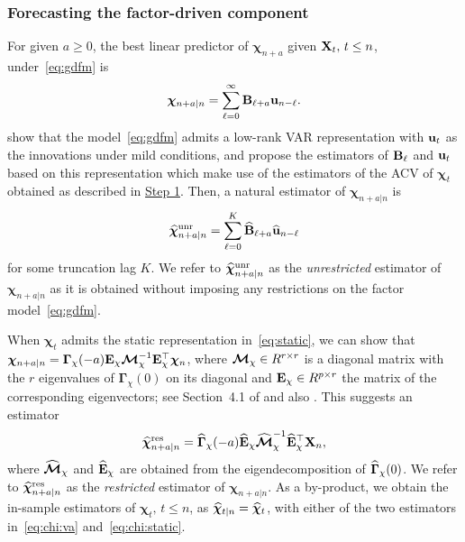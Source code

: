 \subsubsection{Forecasting the factor-driven component}
\label{sec:common:pred}

For given $a \ge 0$, the best linear predictor of $\bm\chi_{n + a}$ given $\mathbf X_t, \, t \le n$, under~\eqref{eq:gdfm} is 
\begin{align*}
\bm\chi_{n + a \vert n} = \sum_{\ell = 0}^\infty \mathbf B_{\ell + a} \mathbf u_{n  - \ell}.
\end{align*}
\cite{forni2015dynamic} show that the model~\eqref{eq:gdfm} admits a low-rank VAR representation with $\mathbf u_t$ as the innovations under mild conditions, and \cite{forni2017dynamic} propose the estimators of $\mathbf B_\ell$ and $\mathbf u_t$ based on this representation which make use of the estimators of the ACV of $\bm\chi_t$ obtained as described in \hyperref[sec:step:one]{Step 1}.
Then, a natural estimator of $\bm\chi_{n + a \vert n}$ is
\begin{align}
\label{eq:chi:va}
\widehat{\bm\chi}^{\text{\upshape{unr}}}_{n + a \vert n} = \sum_{\ell = 0}^K \widehat{\mathbf B}_{\ell + a} \widehat{\mathbf u}_{n  - \ell}
\end{align}
for some truncation lag $K$.
We refer to $\widehat{\bm\chi}^{\text{\upshape{unr}}}_{n + a \vert n}$ as the {\it unrestricted} estimator of $\bm\chi_{n + a \vert n}$ as it is obtained without imposing any restrictions on the factor model~\eqref{eq:gdfm}.

When $\bm\chi_t$ admits the static representation in~\eqref{eq:static}, we can show that $\bm\chi_{n + a \vert n} = \bm{\Gamma}_\chi( - a) \mathbf E_\chi \bm{\mathcal M}_\chi^{-1} \mathbf E_\chi^\top \bm\chi_n$, where $\bm{\mathcal M}_\chi \in R^{r \times r}$ is a diagonal matrix with the $r$ eigenvalues of $\bm\Gamma_\chi(0)$ on its diagonal and $\mathbf E_\chi \in R^{p \times r}$ the matrix of the corresponding eigenvectors; see Section~4.1 of \cite{barigozzi2022fnets} and also \cite{forni2005generalized}.
This suggests an estimator
\begin{align}
\label{eq:chi:static}
\widehat{\bm\chi}^{\text{\upshape {res}}}_{n + a \vert n} = \widehat{\bm\Gamma}_\chi(-a) \widehat{\mathbf E}_\chi \widehat{\bm{\mathcal M}}_\chi^{-1} \widehat{\mathbf E}_\chi^\top \mathbf X_n,
\end{align}
where $\widehat{\bm{\mathcal M}}_\chi$ and $\widehat{\mathbf E}_\chi$ are obtained from the eigendecomposition of $\widehat{\bm\Gamma}_\chi(0)$.
We refer to $\widehat{\bm\chi}^{\text{\upshape {res}}}_{n + a \vert n}$ as the {\it restricted} estimator of $\bm\chi_{n + a \vert n}$.
As a by-product, we obtain the in-sample estimators of $\bm\chi_t, \, t \le n$, as $\widehat{\bm\chi}_{t \vert n} = \widehat{\bm\chi}_t$, with either of the two estimators in~\eqref{eq:chi:va} and~\eqref{eq:chi:static}.

